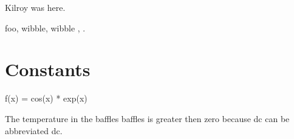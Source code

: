 \documentclass{article}
\begin{document}
Kilroy was here.

foo, wibble, wibble \cite{wibble}, .

\section{Constants}


\begin{sageblock}
  f(x) = cos(x) * exp(x)
\end{sageblock}

The temperature in  the \gls{baffles} baffles is greater then \gls{zero} because
\acrlong{dc} can be abbreviated \acrshort{dc}.

\printnomenclature
\printglossary[type=\acronymtype]
\printglossary
\printbibliography
\printindex
\end{document}
